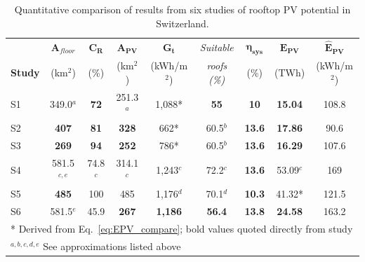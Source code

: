 \begin{table}[htb]
\centering
\footnotesize
\caption{Quantitative comparison of results from six studies of rooftop PV potential in Switzerland.}
\label{tab:compare_values}
\begin{tabular}{lcccccccc}
\hline
     & $\boldsymbol{A_{\mathit{floor}}}$       & $\boldsymbol{C_R}$          & $\boldsymbol{A_{PV}}$          & $\boldsymbol{G_t}$             & \textit{Suitable}   & $\boldsymbol{\eta_{sys}}$          & $\boldsymbol{E_{PV}}$            & $\boldsymbol{\hat{E}_{PV}}$       \\
\textbf{Study} & (km$^2$)        & (\%)        & (km$^2$)        & (kWh/m$^2$)       & \textit{roofs (\%)} & (\%)          & (TWh)          & (kWh/m$^2$) \\ \hline
S1             & 349.0$^a$   & \textbf{72} & 251.3$^a$       & 1,088*         & \textbf{55}         & \textbf{10}   & \textbf{15.04} & 108.8    \\
S2             & \textbf{407} & \textbf{81} & \textbf{328} & 662*           & 60.5$^b$               & \textbf{13.6} & \textbf{17.86} & 90.6     \\
S3             & \textbf{269} & \textbf{94} & \textbf{252} & 786*           & 60.5$^b$               & \textbf{13.6} & \textbf{16.29} & 107.6    \\
S4             & 581.5$^{c,e}$       & 74.8$^c$       & 314.1$^c$       & 1,243$^c$         & 72.2$^c$               & \textbf{13.6} & 53.09$^c$         & 169      \\
S5             & \textbf{485} & 100         & 485          & 1,176$^d$         & 70.1$^d$               & \textbf{10.3} & 41.32*         & 121.5    \\
S6             & 581.5$^e$       & 45.9        & \textbf{267} & \textbf{1,186} & \textbf{56.4}       & \textbf{13.8} & \textbf{24.58} & 163.2    \\ \hline
\multicolumn{9}{l}{* Derived from Eq.~\ref{eq:EPV_compare}; bold values quoted directly from study}   \\ 
\multicolumn{9}{l}{$^{a,b,c,d,e}$ See approximations listed above}
\end{tabular}

\end{table}

